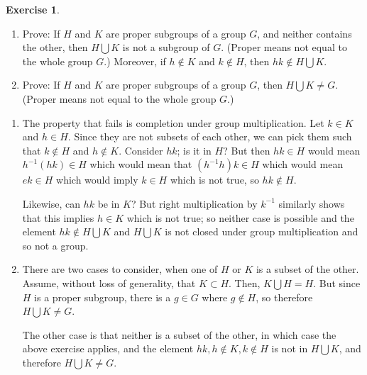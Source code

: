 \documentclass[11pt,oneside]{article}
\numberwithin{equation}{section}
\theoremstyle{definition}
\newtheorem{exercise}{Exercise}
\begin{document}
\begin{solution}
\begin{enumerate}[(1)]
\begin{enumerate}[(a)]
\end{enumerate}

\end{enumerate}
\end{solution}

\begin{exercise}
\begin{enumerate}[(1)]
\item 
  Prove: If $H$ and $K$ are proper subgroups of a group $G$, and
  neither contains the other, then $H \bigcup K $ is not a subgroup of
  $G$.  (Proper means not equal to the whole group $G$.)  Moreover,
  if $h \notin K$ and $k \notin H$, then $ hk \notin H \bigcup K$. 
\item 
  Prove: If $H$ and $K$ are proper subgroups of a group $G$, then $H
  \bigcup K \neq G $.  (Proper means not equal to
  the whole group $G$.)
\end{enumerate}  
\end{exercise}

\begin{solution}
  \begin{enumerate}[(1)]
    \item
  The property that fails is completion under group multiplication.
  Let $k \in K$ and $ h \in H$. Since they are not subsets of each
  other, we can pick them such that $ k \notin H$ and $h \notin K$.
  Consider $h k$; is it in $H$?  But then $ h k \in H $ would mean $ h
  ^ {-1} ( h k ) \in H$ which would mean that $ ( h ^ { -1 } h ) k \in
  H $ which would mean $ e k \in H $ which would imply $ k \in H $
  which is not true, so $ h k \notin H$.

  Likewise, can $ h k $ be in $K$?  But right multiplication by $ k ^
  { -1 } $ similarly shows that this implies $ h \in K $ which is not
  true; so neither case is possible and the element $ h k \notin H
  \bigcup K $ and $ H \bigcup K $ is not closed under group
  multiplication and so not a group.
\item
  There are two cases to consider, when one of $H$ or $K$ is a subset of
  the other.  Assume, without loss of generality, that $ K \subset H $.
  Then, $ K \bigcup H = H$.  But since $H$ is a proper subgroup, there is a
  $ g \in G$ where $g \notin H$, so therefore $H \bigcup K \neq G$.

  The other case is that neither is a subset of the other, in which
  case the above exercise applies, and the element $ hk, h \notin K, k
  \notin H$ is not in $ H \bigcup K$, and therefore $H \bigcup K \neq G$.
  \end{enumerate}

\end{solution}
\end{document}
